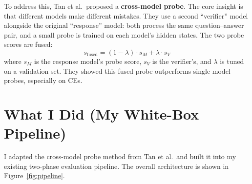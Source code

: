 \documentclass[11pt]{article}
\begin{document}
To address this, Tan et al.\ proposed a \textbf{cross-model probe}. The core insight is that different models make different mistakes. They use a second ``verifier'' model alongside the original ``response'' model: both process the same question--answer pair, and a small probe is trained on each model's hidden states. The two probe scores are fused:
\[
    s_{\text{fused}} = (1 - \lambda) \cdot s_M + \lambda \cdot s_V
\]
where $s_M$ is the response model's probe score, $s_V$ is the verifier's, and $\lambda$ is tuned on a validation set. They showed this fused probe outperforms single-model probes, especially on CEs.

\section{What I Did (My White-Box Pipeline)}

I adapted the cross-model probe method from Tan et al.\ and built it into my existing two-phase evaluation pipeline. The overall architecture is shown in Figure~\ref{fig:pipeline}.
\end{document}
